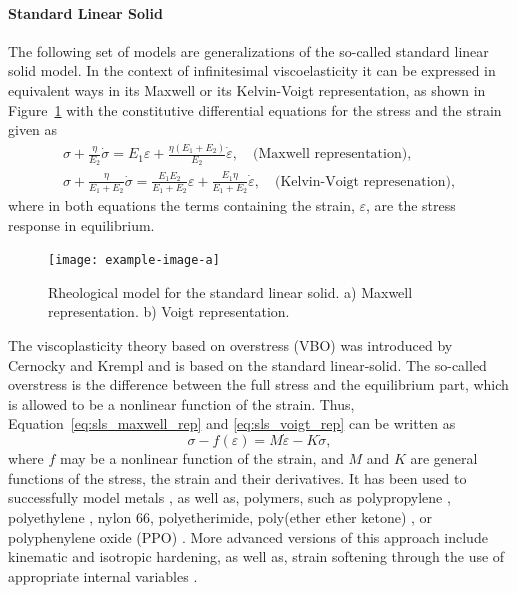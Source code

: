 \paragraph{Standard Linear Solid}
The following set of models are generalizations of the so-called standard linear solid model.
In the context of infinitesimal viscoelasticity it can be expressed in equivalent ways in its Maxwell or its Kelvin-Voigt representation, as shown in Figure~\ref{fig:rheo_model_sls} with the constitutive differential equations for the stress and the strain given as
\begin{gather}
	\sigma+\frac{\eta}{E_2} \dot{\sigma}=E_1 \varepsilon+\frac{\eta\left(E_1+E_2\right)}{E_2} \dot{\varepsilon},\quad\text{(Maxwell representation)},
	\label{eq:sls_maxwell_rep}\\
	\sigma+\frac{\eta}{E_1+E_2} \dot{\sigma}=\frac{E_1 E_2}{E_1+E_2} \varepsilon+\frac{E_1 \eta}{E_1+E_2} \dot{\varepsilon},\quad\text{(Kelvin-Voigt represenation)},
	\label{eq:sls_voigt_rep}
\end{gather}
where in both equations the terms containing the strain, $\varepsilon$, are the stress response in equilibrium.
\begin{figure}
	\centering
	\texttt{[image: example-image-a]}
	\caption{Rheological model for the standard linear solid. a) Maxwell representation. b) Voigt representation.}
\label{fig:rheo_model_sls}
\end{figure}

The viscoplasticity theory based on overstress (VBO) was introduced by Cernocky and Krempl \citep{cernockyTheoryViscoplasticityBased1980} and is based on the standard linear-solid.
The so-called overstress is the difference between the full stress and the equilibrium part, which is allowed to be a nonlinear function of the strain.
Thus, Equation~\eqref{eq:sls_maxwell_rep} and \eqref{eq:sls_voigt_rep} can be written as
\begin{equation}
	\sigma - f(\varepsilon) = M\dot\varepsilon - K\dot \sigma,
\end{equation}
where $f$ may be a nonlinear function of the strain, and $M$ and $K$ are general functions of the stress, the strain and their derivatives.
It has been used to successfully model metals \citep{liuUniaxialViscoplasticModel1979, yaoViscoplasticityTheoryBased1985}, as well as, polymers, such as polypropylene \citep{kitagawaRatedependentNonlinearConstitutive1989}, polyethylene \citep{kitagawaNonlinearConstitutiveEquation1990}, nylon 66, polyetherimide, poly(ether ether ketone) \citep{krempl2000overstress}, or polyphenylene oxide (PPO) \citep{colakModelingDeformationBehavior2005}.
More advanced versions of this approach include kinematic and isotropic hardening, as well as, strain softening through the use of appropriate internal variables \citep{krempl2000overstress, hoExtensionViscoplasticityTheory2002}.

